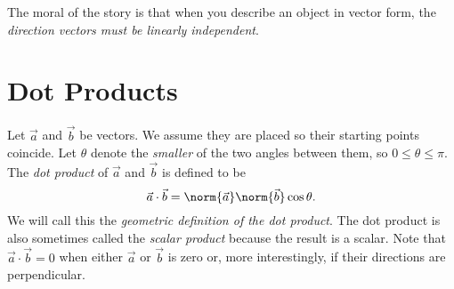 The moral of the story is that when you describe an object in vector form, the \emph{direction vectors must be linearly
independent}. 


\section{Dot Products}
Let $\vec a$ and $\vec b$ be vectors.  We assume they are placed so their
starting points coincide.  Let $\theta$ denote the \emph{smaller} of the
two angles between them, so $0\le \theta \le \pi$.
The \emph{dot product} of $\vec a$ and $\vec b$ is defined to be
\[
	\vec a\cdot \vec b=\norm{\vec a}\norm{\vec b}\cos \theta.
\]
We will call this the \emph{geometric definition of the dot product}.
The dot product is also sometimes called the \emph{scalar product} because
the result is a scalar.
Note that $\vec a\cdot\vec b = 0$ when either $\vec a$ or $\vec b$ is zero or,
more interestingly, if their directions are perpendicular.

\begin{center}
	\newcommand{\tikzAngleOfLine}{\tikz@AngleOfLine}
	  \def\tikz@AngleOfLine(#1)(#2)#3{%
	  \pgfmathanglebetweenpoints{%
	    \pgfpointanchor{#1}{center}}{%
	    \pgfpointanchor{#2}{center}}
	  \pgfmathsetmacro{#3}{\pgfmathresult}%
	  }
	\newcommand{\tikzMarkAngle}[3]{
	\tikzAngleOfLine#1#2{\AngleStart}
	\tikzAngleOfLine#1#3{\AngleEnd}
	\draw #1+(\AngleStart:0.35cm) arc (\AngleStart:\AngleEnd:0.35cm);
	}
	\usetikzlibrary{patterns,decorations.pathreplacing}
	\hspace{1cm}
\end{center}

